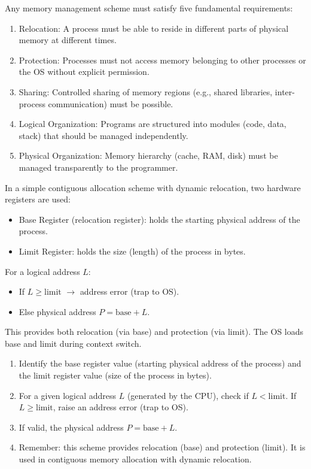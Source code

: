 \documentclass[11pt]{article}
\newcommand{\cle}[1]{{\popxbold\color{popdark}#1}}
\begin{document}
\begin{definition}
Any memory management scheme must satisfy five fundamental requirements:
\begin{enumerate}
\item \cle{Relocation}: A process must be able to reside in different parts of physical memory at different times.
\item \cle{Protection}: Processes must not access memory belonging to other processes or the OS without explicit permission.
\item \cle{Sharing}: Controlled sharing of memory regions (e.g., shared libraries, inter-process communication) must be possible.
\item \cle{Logical Organization}: Programs are structured into modules (code, data, stack) that should be managed independently.
\item \cle{Physical Organization}: Memory hierarchy (cache, RAM, disk) must be managed transparently to the programmer.
\end{enumerate}
\end{definition}

\begin{propriete}
In a simple \cle{contiguous allocation} scheme with dynamic relocation, two hardware registers are used:
\begin{itemize}
\item \cle{Base Register} (relocation register): holds the starting physical address of the process.
\item \cle{Limit Register}: holds the size (length) of the process in bytes.
\end{itemize}
For a logical address $L$:
\begin{itemize}
\item If $L \ge \text{limit}$ $\rightarrow$ \cle{address error} (trap to OS).
\item Else physical address $P = \text{base} + L$.
\end{itemize}
This provides both relocation (via base) and protection (via limit). The OS loads base and limit during context switch.
\end{propriete}

\begin{methode}
\begin{enumerate}
\item Identify the \cle{base register} value (starting physical address of the process) and the \cle{limit register} value (size of the process in bytes).
\item For a given \cle{logical address} $L$ (generated by the CPU), check if $L < \text{limit}$. If $L \ge \text{limit}$, raise an \cle{address error} (trap to OS).
\item If valid, the \cle{physical address} $P = \text{base} + L$.
\item Remember: this scheme provides \cle{relocation} (base) and \cle{protection} (limit). It is used in \cle{contiguous memory allocation} with dynamic relocation.
\end{enumerate}
\end{methode}
\end{document}

